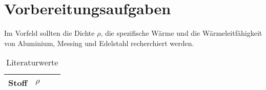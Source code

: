 \section{Vorbereitungsaufgaben}
\label{sec:Vorbereitungsaufgaben}
Im Vorfeld sollten die Dichte $\rho$, die spezifische Wärme und die Wärmeleitfähigkeit von Aluminium, Messing
und Edelstahl recherchiert werden. 
\begin{table}
    \centering
    \caption{Literaturwerte}
    \label{tab:Literaturwerte}
    \begin{tabular}{S S[table-format=1.2] S[table-format=1.4] S[table-format=3.2]}
        \toprule
        {Stoff} & {$\rho$} & {} & {} \\
        \midrule
        \bottomrule
    \end{tabular}
\end{table}